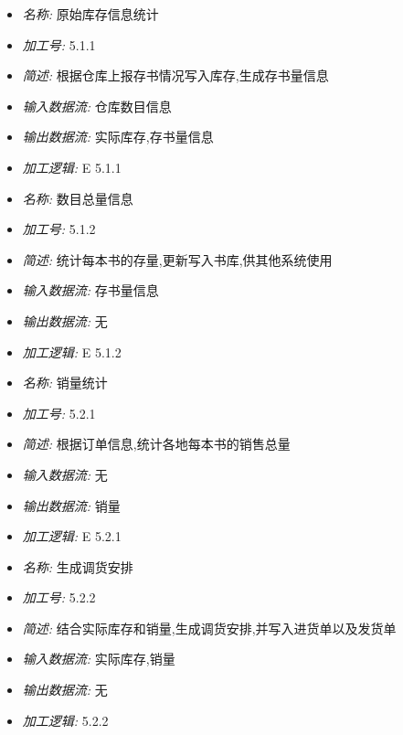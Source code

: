\documentclass{article}
\begin{document}
\begin{CJK*}{UTF8}{gbsn}
\begin{itemize}
\end{itemize}


\vspace{-1mm}


\begin{itemize}
\item \textit{名称: } 原始库存信息统计
\item \textit{加工号: }5.1.1
\item \textit{简述: } 根据仓库上报存书情况写入库存,生成存书量信息 
\item \textit{输入数据流: } 仓库数目信息
\item \textit{输出数据流: } 实际库存,存书量信息
\item \textit{加工逻辑: } E 5.1.1

\end{itemize}


\vspace{-1mm}


\begin{itemize}
\item \textit{名称: } 数目总量信息
\item \textit{加工号: }5.1.2
\item \textit{简述: } 统计每本书的存量,更新写入书库,供其他系统使用 
\item \textit{输入数据流: } 存书量信息
\item \textit{输出数据流: } 无
\item \textit{加工逻辑: } E 5.1.2

\end{itemize}


\vspace{-1mm}


\begin{itemize}
\item \textit{名称: }销量统计
\item \textit{加工号: }5.2.1
\item \textit{简述: } 根据订单信息,统计各地每本书的销售总量 
\item \textit{输入数据流: } 无
\item \textit{输出数据流: } 销量
\item \textit{加工逻辑: } E 5.2.1

\end{itemize}


\vspace{-1mm}


\begin{itemize}
\item \textit{名称: }生成调货安排
\item \textit{加工号: }5.2.2
\item \textit{简述: } 结合实际库存和销量,生成调货安排,并写入进货单以及发货单 
\item \textit{输入数据流: } 实际库存,销量
\item \textit{输出数据流: } 无
\item \textit{加工逻辑: } 5.2.2


\end{itemize}
\end{CJK*}
\end{document}
